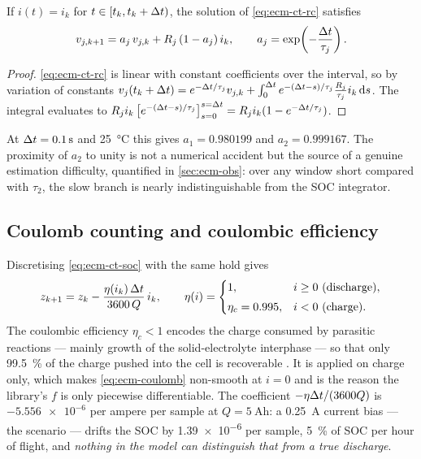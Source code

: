 \begin{proposition}\label{prop:ecm-zoh}
If $i(t) = i_k$ for $t\in[t_k, t_k+\Delta t)$, the solution of \eqref{eq:ecm-ct-rc} satisfies
\begin{equation}
v_{j,k+1} = a_j\,v_{j,k} + R_j\left(1-a_j\right) i_k, \qquad
a_j = \exp\!\left(-\frac{\Delta t}{\tau_j}\right).
\label{eq:ecm-zoh}
\end{equation}
\end{proposition}
\begin{proof}
\eqref{eq:ecm-ct-rc} is linear with constant coefficients over the interval, so by variation of
constants
$v_j(t_k+\Delta t) = e^{-\Delta t/\tau_j}v_{j,k} + \int_0^{\Delta t} e^{-(\Delta t-s)/\tau_j}\frac{R_j}{\tau_j}i_k\,
\mathrm{d}s$. The integral evaluates to
$R_j i_k\left[e^{-(\Delta t-s)/\tau_j}\right]_{s=0}^{s=\Delta t} = R_j i_k(1 - e^{-\Delta t/\tau_j})$.
\end{proof}

At $\Delta t=\SI{0.1}{\second}$ and \SI{25}{\celsius} this gives $a_1 = 0.980199$ and
$a_2 = 0.999167$. The proximity of $a_2$ to unity is not a numerical accident but the source of
a genuine estimation difficulty, quantified in \cref{sec:ecm-obs}: over any window short compared
with $\tau_2$, the slow branch is nearly indistinguishable from the SOC integrator.

\subsection{Coulomb counting and coulombic efficiency}
\label{sec:ecm-coulomb}
Discretising \eqref{eq:ecm-ct-soc} with the same hold gives
\begin{equation}
z_{k+1} = z_k - \frac{\eta(i_k)\,\Delta t}{3600\,Q}\,i_k,
\qquad
\eta(i) = \begin{cases} 1, & i \ge 0 \ (\text{discharge}),\\[1mm]
 \eta_c = 0.995, & i < 0 \ (\text{charge}).\end{cases}
\label{eq:ecm-coulomb}
\end{equation}
The coulombic efficiency $\eta_c<1$ encodes the charge consumed by parasitic reactions --- mainly
growth of the solid-electrolyte interphase --- so that only \SI{99.5}{\percent} of the charge
pushed into the cell is recoverable \cite{ng2009coulomb,smith2010coulombic}. It is applied on
charge only, which makes \eqref{eq:ecm-coulomb} non-smooth at $i=0$ and is the reason the
library's $f$ is only piecewise differentiable. The coefficient $-\eta\Delta t/(3600Q)$ is
$\num{-5.556e-6}$ per ampere per sample at $Q=\SI{5}{\ampere\hour}$: a \SI{0.25}{\ampere} current
bias --- the  scenario --- drifts the SOC by \SI{1.39e-6}{} per sample,
\SI{5}{\percent} of SOC per hour of flight, and \emph{nothing in the model can distinguish that from a
true discharge}.

